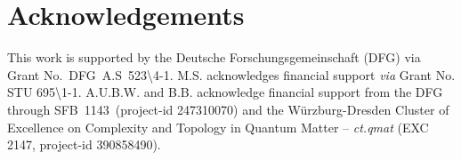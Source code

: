 \documentclass[twocolumn,superscriptaddress,prb,preprintnumbers,nobibnotes,aps]{revtex4-2}  %
\begin{document}
\section{Acknowledgements}
This work is supported by the Deutsche Forschungsgemeinschaft (DFG) via Grant No.~DFG~A.S~523\textbackslash4-1. M.S. acknowledges financial support \textit{via} Grant No. STU 695\textbackslash1-1. A.U.B.W. and B.B. acknowledge financial support from the DFG through SFB~1143~(project-id 247310070) and the W\"urzburg-Dresden Cluster of Excellence on Complexity and Topology in Quantum Matter -- \textit{ct.qmat} (EXC 2147, project-id 390858490).



\end{document}
